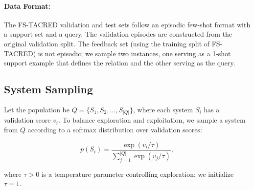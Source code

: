 \documentclass[12pt]{article}
\begin{document}
\paragraph{Data Format:}
The FS-TACRED validation and test sets follow an episodic few-shot format with a support set and a query.
The validation episodes are constructed from the original validation split.
The feedback set (using the training split of FS-TACRED) is not episodic; we sample two instances, one serving as a 1-shot support example that defines the relation and the other serving as the query.

\subsection{System Sampling}
\label{subsec:sampling_system}

Let the population be $Q = \{S_1, S_2, \dots, S_{|Q|}\}$, where each system $S_i$ has a validation score $v_i$.
To balance exploration and exploitation, we sample a system from $Q$ according to a softmax distribution over validation scores:

\[
p(S_i) = \frac{\exp\left(v_i / \tau\right)}{\sum_{j=1}^{|Q|} \exp\left(v_j / \tau\right)},
\]

where $\tau > 0$ is a temperature parameter controlling exploration; we initialize $\tau = 1$.

%   
%     
\end{document}

